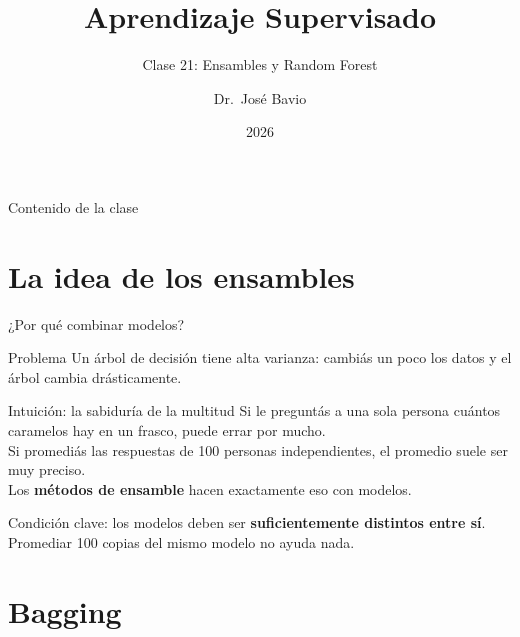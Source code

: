 \documentclass[aspectratio=169]{beamer}
\title[MAD1 -- Unidad 4]{Aprendizaje Supervisado}
\subtitle{Clase 21: Ensambles y Random Forest}
\author[J. Bavio]{Dr.\ José Bavio}
\institute[UNS]{Departamento de Matemática\\Universidad Nacional del Sur}
\date{2026}
\begin{document}
\begin{frame}
  \titlepage
\end{frame}

\begin{frame}{Contenido de la clase}
  \tableofcontents
\end{frame}

\section{La idea de los ensambles}

\begin{frame}{¿Por qué combinar modelos?}
  \begin{block}{Problema}
    Un árbol de decisión tiene alta varianza: cambiás un poco los datos y el árbol cambia drásticamente.
  \end{block}

  \medskip
  \begin{exampleblock}{Intuición: la sabiduría de la multitud}
    Si le preguntás a una sola persona cuántos caramelos hay en un frasco, puede errar por mucho.\\
    Si promediás las respuestas de 100 personas independientes, el promedio suele ser muy preciso.\\[4pt]
    Los \textbf{métodos de ensamble} hacen exactamente eso con modelos.
  \end{exampleblock}

  \medskip
  Condición clave: los modelos deben ser \textbf{suficientemente distintos entre sí}.\\
  Promediar 100 copias del mismo modelo no ayuda nada.
\end{frame}

\section{Bagging}
\end{document}
